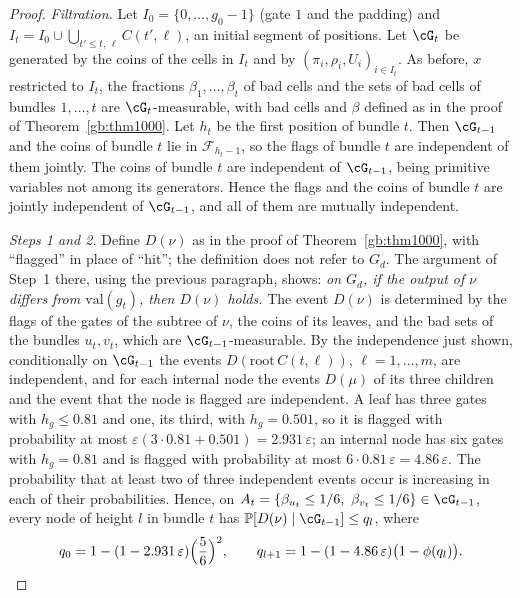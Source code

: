 \documentclass[11pt]{amsart}
\theoremstyle{definition}
\theoremstyle{remark}
\newcommand{\eps}{\varepsilon}
\newcommand{\val}{\mathrm{val}}
\newcommand{\PP}{\mathbb{P}}
\newcommand{\cF}{\mathcal{F}}
\begin{document}
\begin{proof}
\emph{Filtration.} Let $I_0=\{0,\dots,g_0-1\}$ (gate $1$ and the padding)
and $I_t=I_0\cup\bigcup_{t'\le t,\,\ell}C(t',\ell)$, an initial segment of
positions. Let $\cG_t$ be generated by the coins of the cells in $I_t$ and
by $(\pi_i,\rho_i,U_i)_{i\in I_t}$. As before, $x$ restricted to $I_t$, the
fractions $\beta_1,\dots,\beta_t$ of bad cells and the sets of bad cells of
bundles $1,\dots,t$ are $\cG_t$-measurable, with bad cells and $\beta$
defined as in the proof of Theorem~\ref{gb:thm1000}. Let $h_t$ be the first
position of bundle $t$. Then $\cG_{t-1}$ and the coins of bundle $t$ lie in
$\cF_{h_t-1}$, so the flags of bundle $t$ are independent of them jointly.
The coins of bundle $t$ are independent of $\cG_{t-1}$, being primitive
variables not among its generators. Hence the flags and the coins of bundle
$t$ are jointly independent of $\cG_{t-1}$, and all of them are mutually
independent.

\emph{Steps 1 and 2.} Define $D(\nu)$ as in the proof of
Theorem~\ref{gb:thm1000}, with ``flagged'' in place of ``hit''; the
definition does not refer to $G_d$. The argument of Step~1 there, using the
previous paragraph, shows: \emph{on $G_d$, if the output of $\nu$ differs
from $\val(g_t)$, then $D(\nu)$ holds.} The event $D(\nu)$ is determined by
the flags of the gates of the subtree of $\nu$, the coins of its leaves,
and the bad sets of the bundles $u_t,v_t$, which are
$\cG_{t-1}$-measurable. By the independence just shown, conditionally on
$\cG_{t-1}$ the events $D(\mathrm{root}\,C(t,\ell))$, $\ell=1,\dots,m$, are
independent, and for each internal node the events $D(\mu)$ of its three
children and the event that the node is flagged are independent. A leaf has
three gates with $h_g\le0.81$ and one, its third, with $h_g=0.501$, so it is
flagged with probability at most $\eps(3\cdot0.81+0.501)=2.931\,\eps$; an
internal node has six gates with $h_g=0.81$ and is flagged with probability
at most $6\cdot0.81\,\eps=4.86\,\eps$. The probability that at least two of
three independent events occur is increasing in each of their
probabilities. Hence, on
$A_t=\{\beta_{u_t}\le1/6,\ \beta_{v_t}\le1/6\}\in\cG_{t-1}$, every node of
height $l$ in bundle $t$ has $\PP[D(\nu)\mid\cG_{t-1}]\le q_l$, where
\begin{equation}\label{gb:eq-q64}
q_0=1-(1-2.931\,\eps)\Bigl(\frac56\Bigr)^2,\qquad
q_{l+1}=1-(1-4.86\,\eps)\bigl(1-\phi(q_l)\bigr).
\end{equation}


\end{proof}
\end{document}
